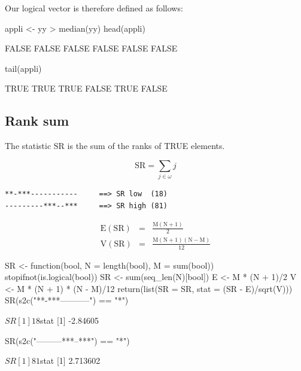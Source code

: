 \documentclass{article}
\begin{document}
Our logical vector is therefore defined as follows:

\begin{Schunk}
\begin{Sinput}
 appli <- yy > median(yy)
 head(appli)
\end{Sinput}
\begin{Soutput}
[1] FALSE FALSE FALSE FALSE FALSE FALSE
\end{Soutput}
\begin{Sinput}
 tail(appli)
\end{Sinput}
\begin{Soutput}
[1]  TRUE  TRUE  TRUE FALSE  TRUE FALSE
\end{Soutput}
\end{Schunk}

\subsection{Rank sum}

The statistic $\mathrm{SR}$ is the sum of the ranks of TRUE elements.

$$
\mathrm{SR} = \sum_{j \in \omega}{j}
$$

\begin{verbatim}
**-***-----------     ==> SR low  (18)
---------***--***     ==> SR high (81)
\end{verbatim}

\begin{eqnarray*}
\mathrm{E(SR)} & = & \mathrm{\frac{M(N + 1)}{2}} \\
\mathrm{V(SR)} & = & \mathrm{\frac{M(N + 1)(N - M)}{12}}
\end{eqnarray*}


\begin{Schunk}
\begin{Sinput}
 SR <- function(bool, N = length(bool), M = sum(bool)) {
     stopifnot(is.logical(bool))
     SR <- sum(seq_len(N)[bool])
     E <- M * (N + 1)/2
     V <- M * (N + 1) * (N - M)/12
     return(list(SR = SR, stat = (SR - E)/sqrt(V)))
 }
 SR(s2c("**-***-----------") == "*")
\end{Sinput}
\begin{Soutput}
$SR
[1] 18

$stat
[1] -2.84605
\end{Soutput}
\begin{Sinput}
 SR(s2c("---------***--***") == "*")
\end{Sinput}
\begin{Soutput}
$SR
[1] 81

$stat
[1] 2.713602
\end{Soutput}
\end{Schunk}
\end{document}
